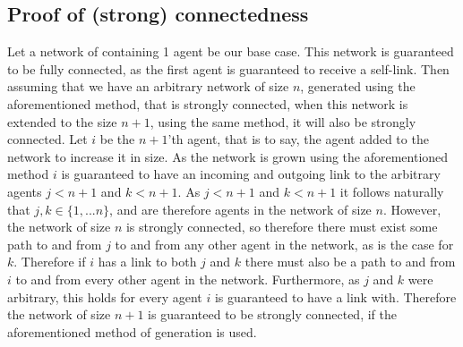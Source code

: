 \documentclass{article}
\begin{document}
\subsection{Proof of (strong) connectedness}
Let a network of containing 1 agent be our base case. This network is guaranteed to be fully connected, as the first agent is guaranteed to receive a self-link. Then assuming that we have an arbitrary network of size $n$, generated using the aforementioned method, that is strongly connected, when this network is extended to the size $n+1$, using the same method, it will also be strongly connected. Let $i$ be the $n+1$'th agent, that is to say, the agent added to the network to increase it in size. As the network is grown using the aforementioned method $i$ is guaranteed to have an incoming and outgoing link to the arbitrary agents $j < n+1$ and $k < n+1$. As $j < n+1$ and $k < n+1$ it follows naturally that $j, k \in \{1, ... n\}$, and are therefore agents in the network of size $n$. However, the network of size $n$ is strongly connected, so therefore there must exist some path to and from $j$ to and from any other agent in the network, as is the case for $k$. Therefore if $i$ has a link to both $j$ and $k$ there must also be a path to and from $i$ to and from every other agent in the network. Furthermore, as $j$ and $k$ were arbitrary, this holds for every agent $i$ is guaranteed to have a link with. Therefore the network of size $n+1$ is guaranteed to be strongly connected, if the aforementioned method of generation is used.\newline




\newpage
\end{document}
